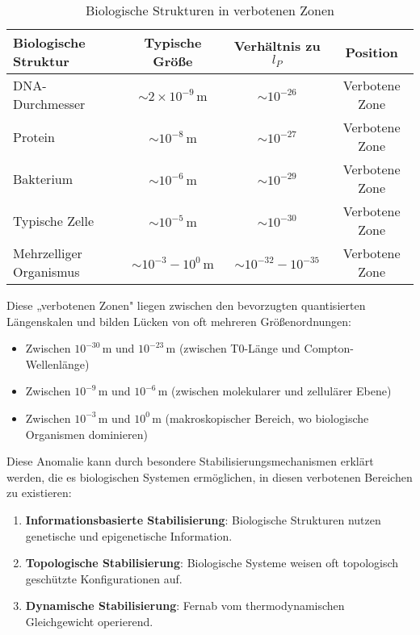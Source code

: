 \documentclass[12pt,a4paper]{article}
\begin{document}
	\begin{table}[H]
		\centering
		\begin{tabular}{lccc}
			\toprule
			\textbf{Biologische Struktur} & \textbf{Typische Größe} & \textbf{Verhältnis zu \(l_P\)} & \textbf{Position} \\
			\midrule
			DNA-Durchmesser & \(\sim 2 \times 10^{-9} \, \text{m}\) & \(\sim 10^{-26}\) & Verbotene Zone \\
			Protein & \(\sim 10^{-8} \, \text{m}\) & \(\sim 10^{-27}\) & Verbotene Zone \\
			Bakterium & \(\sim 10^{-6} \, \text{m}\) & \(\sim 10^{-29}\) & Verbotene Zone \\
			Typische Zelle & \(\sim 10^{-5} \, \text{m}\) & \(\sim 10^{-30}\) & Verbotene Zone \\
			Mehrzelliger Organismus & \(\sim 10^{-3} - 10^{0} \, \text{m}\) & \(\sim 10^{-32} - 10^{-35}\) & Verbotene Zone \\
			\bottomrule
		\end{tabular}
		\caption{Biologische Strukturen in verbotenen Zonen}
		\label{tab:biologische_anomalien}
	\end{table}
	
	Diese „verbotenen Zonen" liegen zwischen den bevorzugten quantisierten Längenskalen und bilden Lücken von oft mehreren Größenordnungen:
	\begin{itemize}
		\item Zwischen \(10^{-30} \, \text{m}\) und \(10^{-23} \, \text{m}\) (zwischen T0-Länge und Compton-Wellenlänge)
		\item Zwischen \(10^{-9} \, \text{m}\) und \(10^{-6} \, \text{m}\) (zwischen molekularer und zellulärer Ebene)
		\item Zwischen \(10^{-3} \, \text{m}\) und \(10^{0} \, \text{m}\) (makroskopischer Bereich, wo biologische Organismen dominieren)
	\end{itemize}
	
	Diese Anomalie kann durch besondere Stabilisierungsmechanismen erklärt werden, die es biologischen Systemen ermöglichen, in diesen verbotenen Bereichen zu existieren:
	
	\begin{enumerate}
		\item \textbf{Informationsbasierte Stabilisierung}: Biologische Strukturen nutzen genetische und epigenetische Information.
		\item \textbf{Topologische Stabilisierung}: Biologische Systeme weisen oft topologisch geschützte Konfigurationen auf.
		\item \textbf{Dynamische Stabilisierung}: Fernab vom thermodynamischen Gleichgewicht operierend.
	\end{enumerate}
	
\end{document}
